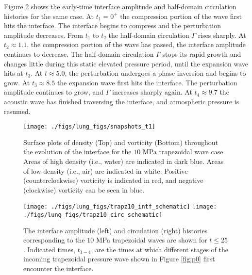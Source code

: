 Figure \ref{fig:trapz10_circ_interface} shows the
early-time interface amplitude and half-domain circulation histories
for the same case. At $t_1=0^+$ the compression portion of the wave
first hits the interface. The interface begins to compress and the
perturbation amplitude decreases. From $t_1$ to $t_2$ the half-domain
circulation $\Gamma$ rises sharply. At $t_2\approx1.1$, the
compression portion of the wave has passed, the interface amplitude
continues to decrease. The half-domain circulation $\Gamma$ stops its
rapid growth and changes little during this static elevated pressure
period, until the expansion wave hits at $t_3$. At $t\approx 5.0$, the
perturbation undergoes a phase inversion and begins to grow. At
$t_3\approx8.5$ the expansion wave first hits the interface. The
perturbation amplitude continues to grow, and $\Gamma$ increases
sharply again. At $t_4\approx9.7$ the acoustic wave has finished
traversing the interface, and atmospheric pressure is resumed.
%
\begin{figure}[h] 
  \centering
\texttt{[image: ./figs/lung\_figs/snapshots\_t1]}
\caption[The evolution of the acoustically perturbed interface and vorticity field]{Surface plots of density (Top) and vorticity (Bottom)
  throughout the evolution of the interface for the $10$ MPa
  trapezoidal wave case. Areas of high density (i.e., water) are
indicated in dark blue. Areas of low density (i.e., air) are indicated
in white.  Positive (counterclockwise) vorticity is indicated in red,
and negative (clockwise) vorticity can be seen in blue.}
  \label{fig:interface_snapshots}
\end{figure}
%
\begin{figure}[h] 
  \centering
  \texttt{[image: ./figs/lung\_figs/trapz10\_intf\_schematic]}
  \texttt{[image: ./figs/lung\_figs/trapz10\_circ\_schematic]}
  \caption[The interface amplitude and circulation histories for the $10$ MPa trapezoidal wave]{The interface amplitude (left) and circulation (right)
    histories corresponding to the $10$ MPa trapezoidal waves are
    shown for $t\leq25$. Indicated times, $t_{1-4}$, are the times at
    which different stages of the incoming trapezoidal pressure wave
    shown in Figure \ref{fig:p0} first encounter the interface.}
  \label{fig:trapz10_circ_interface}
\end{figure}
%
